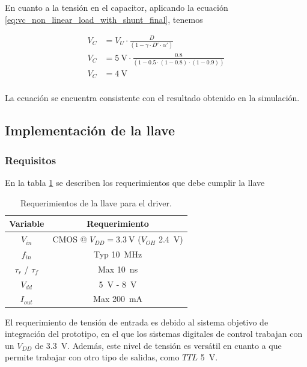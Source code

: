 En cuanto a la tensión en el capacitor, aplicando la ecuación
\ref{eq:vc_non_linear_load_with_shunt_final}, tenemos

\begin{equation}
    \begin{aligned}
        V_C &= V_U \cdot \frac{D}{\left( 1 - \gamma \cdot D' \cdot \alpha'\right)} \\
        V_C &= \qty{5}{\volt} \cdot \frac{0.8}{\left( 1 - 0.5 \cdot (1-0.8)
        \cdot (1-0.9) \right)} \\
        V_C &= \qty{4}{\volt} \\
    \end{aligned}
\end{equation}

La ecuación se encuentra consistente con el resultado obtenido en la simulación.

\subsection{Implementación de la llave}

\subsubsection{Requisitos}

En la tabla \ref{tab:llave_requirements} se describen los requerimientos que
debe cumplir la llave

\begin{table}
\centering
\begin{tabular}{c|c}
\hline
    Variable & Requerimiento \\
\hline
    $V_{in}$                &   CMOS @ $V_{DD}=\qty{3.3}{\volt}$ ($V_{OH}$
    \qty{2.4}{\volt})     \\
    $f_{in}$                &   Typ \qty{10}{\mega\hertz} \\
    $\tau_{r}$ / $\tau_{f}$ &   Max \qty{10}{\nano\second} \\
    $V_{dd}$                &   \qty{5}{\volt} - \qty{8}{\volt} \\
    $I_{out}$               &   Max \qty{200}{\milli\ampere} \\
\hline
\end{tabular}
\caption{Requerimientos de la llave para el driver.}
\label{tab:llave_requirements}
\end{table}

El requerimiento de tensión de entrada es debido al sistema objetivo de
integración del prototipo, en el que los sistemas digitales de control trabajan
con un $V_{DD}$ de \qty{3.3}{\volt}. Además, este nivel de tensión es versátil
en cuanto a que permite trabajar con otro tipo de salidas, como $TTL$
\qty{5}{\volt}.

